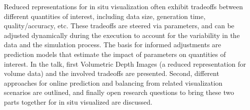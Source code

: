 
\license


Reduced representations for in situ visualization often exhibit tradeoffs between different quantities of interest, including data size, generation time, quality/accuracy, etc. These tradeoffs are steered via parameters, and can be adjusted dynamically during the execution to account for the variability in the data and the simulation process. The basis for informed adjustments are prediction models that estimate the impact of parameters on quantities of interest. In the talk, first Volumetric Depth Images (a reduced representation for volume data) and the involved tradeoffs are presented. Second, different approaches for online prediction and balancing from related visualization scenarios are outlined, and finally open research questions to bring these two parts together for in situ visualized are discussed.

